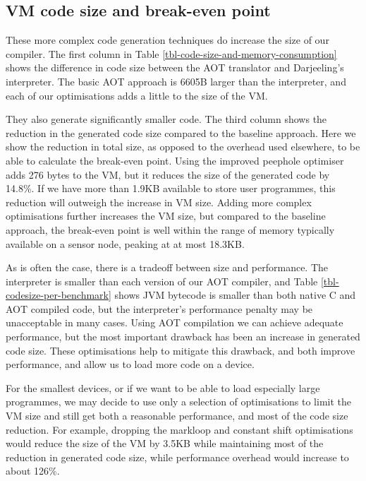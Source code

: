 \subsection{VM code size and break-even point}
These more complex code generation techniques do increase the size of our compiler. The first column in Table \ref{tbl-code-size-and-memory-consumption} shows the difference in code size between the AOT translator and Darjeeling's interpreter. The basic AOT approach is 6605B larger than the interpreter, and each of our optimisations adds a little to the size of the VM.

They also generate significantly smaller code. The third column shows the reduction in the generated code size compared to the baseline approach. Here we show the reduction in total size, as opposed to the overhead used elsewhere, to be able to calculate the break-even point. Using the improved peephole optimiser adds 276 bytes to the VM, but it reduces the size of the generated code by 14.8\%. If we have more than 1.9KB available to store user programmes, this reduction will outweigh the increase in VM size. Adding more complex optimisations further increases the VM size, but compared to the baseline approach, the break-even point is well within the range of memory typically available on a sensor node, peaking at at most 18.3KB.

As is often the case, there is a tradeoff between size and performance. The interpreter is smaller than each version of our AOT compiler, and Table \ref{tbl-codesize-per-benchmark} shows JVM bytecode is smaller than both native C and AOT compiled code, but the interpreter's performance penalty may be unacceptable in many cases. Using AOT compilation we can achieve adequate performance, but the most important drawback has been an increase in generated code size. These optimisations help to mitigate this drawback, and both improve performance, and allow us to load more code on a device.

For the smallest devices, or if we want to be able to load especially large programmes, we may decide to use only a selection of optimisations to limit the VM size and still get both a reasonable performance, and most of the code size reduction. For example, dropping the markloop and constant shift optimisations would reduce the size of the VM by 3.5KB while maintaining most of the reduction in generated code size, while performance overhead would increase to about 126\%.



